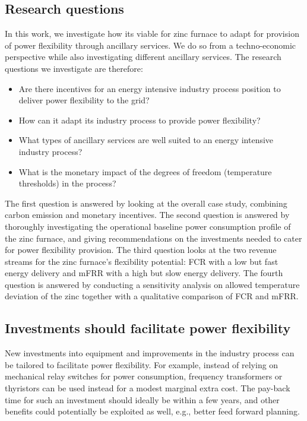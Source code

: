 \documentclass[lettersize,journal]{IEEEtran}
\begin{document}
\subsection{Research questions}

In this work, we investigate how its viable for zinc furnace to adapt for provision of power flexibility through ancillary services. We do so from a techno-economic perspective while also investigating different ancillary services. The research questions we investigate are therefore:

\begin{itemize}
    \item Are there incentives for an energy intensive industry process position to deliver power flexibility to the grid?
    \item How can it adapt its industry process to provide power flexibility?
    \item What types of ancillary services are well suited to an energy intensive industry process?
    \item What is the monetary impact of the degrees of freedom (temperature thresholds) in the process?
\end{itemize}

The first question is answered by looking at the overall case study, combining carbon emission and monetary incentives. The second question is answered by thoroughly investigating the operational baseline power consumption profile of the zinc furnace, and giving recommendations on the investments needed to cater for power flexibility provision. The third question looks at the two revenue streams for the zinc furnace's flexibility potential: FCR with a low but fast energy delivery and mFRR with a high but slow energy delivery. The fourth question is answered by conducting a sensitivity analysis on allowed temperature deviation of the zinc together with a qualitative comparison of FCR and mFRR.


\subsection{Investments should facilitate power flexibility}

New investments into equipment and improvements in the industry process can be tailored to facilitate power flexibility. For example, instead of relying on mechanical relay switches for power consumption, frequency transformers or thyristors can be used instead for a modest marginal extra cost. The pay-back time for such an investment should ideally be within a few years, and other benefits could potentially be exploited as well, e.g., better feed forward planning.
\end{document}
